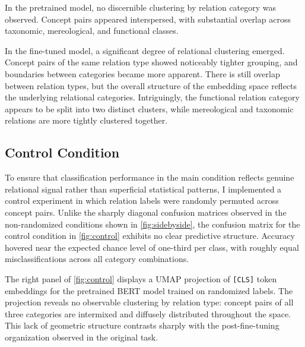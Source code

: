 \documentclass[stu,floatsintext]{apa7}
\begin{document}
In the pretrained model, no discernible clustering by relation category was observed. Concept pairs appeared interspersed, with substantial overlap across taxonomic, mereological, and functional classes.

In the fine-tuned model, a significant degree of relational clustering emerged. Concept pairs of the same relation type showed noticeably tighter grouping, and boundaries between categories became more apparent. There is still overlap between relation types, but the overall structure of the embedding space reflects the underlying relational categories. Intriguingly, the functional relation category appears to be split into two distinct clusters, while mereological and taxonomic relations are more tightly clustered together.

\subsection{Control Condition}

To ensure that classification performance in the main condition reflects genuine relational signal rather than superficial statistical patterns, I implemented a control experiment in which relation labels were randomly permuted across concept pairs. Unlike the sharply diagonal confusion matrices observed in the non-randomized conditions shown in \autoref{fig:sidebyside}, the confusion matrix for the control condition in \autoref{fig:control} exhibits no clear predictive structure. Accuracy hovered near the expected chance level of one-third per class, with roughly equal misclassifications across all category combinations.

The right panel of \autoref{fig:control} displays a UMAP projection of \texttt{[CLS]} token embeddings for the pretrained BERT model trained on randomized labels. The projection reveals no observable clustering by relation type: concept pairs of all three categories are intermixed and diffusely distributed throughout the space. This lack of geometric structure contrasts sharply with the post-fine-tuning organization observed in the original task.
\end{document}
